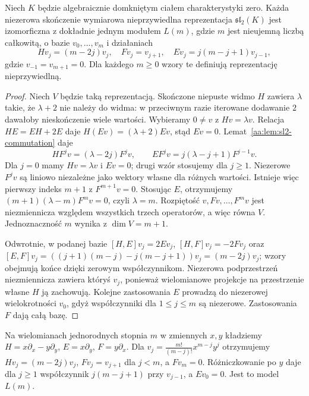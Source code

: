 \begin{twierdzenie}
\label{aa:tw:sl2-simple-modules}
Niech $K$ będzie algebraicznie domkniętym ciałem charakterystyki zero. Każda niezerowa skończenie wymiarowa nieprzywiedlna reprezentacja $\mathfrak{sl}_2(K)$ jest izomorficzna z dokładnie jednym modułem $L(m)$, gdzie $m$ jest nieujemną liczbą całkowitą, o bazie $v_0,\ldots,v_m$ i działaniach
\[
 Hv_j=(m-2j)v_j,\quad Fv_j=v_{j+1},\quad
 Ev_j=j(m-j+1)v_{j-1},
\]
gdzie $v_{-1}=v_{m+1}=0$. Dla każdego $m\ge0$ wzory te definiują reprezentację nieprzywiedlną.
\end{twierdzenie}
\begin{proof}
Niech $V$ będzie taką reprezentacją. Skończone niepuste widmo $H$ zawiera $\lambda$ takie, że $\lambda+2$ nie należy do widma: w przeciwnym razie iterowane dodawanie $2$ dawałoby nieskończenie wiele wartości. Wybieramy $0\ne v$ z $Hv=\lambda v$. Relacja $HE=EH+2E$ daje $H(Ev)=(\lambda+2)Ev$, stąd $Ev=0$. Lemat~\ref{aa:lem:sl2-commutation} daje
\[
 HF^jv=(\lambda-2j)F^jv,\qquad
 EF^jv=j(\lambda-j+1)F^{j-1}v.
\]
Dla $j=0$ mamy $Hv=\lambda v$ i $Ev=0$; drugi wzór stosujemy dla $j\ge1$. Niezerowe $F^jv$ są liniowo niezależne jako wektory własne dla różnych wartości. Istnieje więc pierwszy indeks $m+1$ z $F^{m+1}v=0$. Stosując $E$, otrzymujemy $(m+1)(\lambda-m)F^mv=0$, czyli $\lambda=m$. Rozpiętość $v,Fv,\ldots,F^mv$ jest niezmiennicza względem wszystkich trzech operatorów, a więc równa $V$. Jednoznaczność $m$ wynika z $\dim V=m+1$.

Odwrotnie, w podanej bazie $[H,E]v_j=2Ev_j$, $[H,F]v_j=-2Fv_j$ oraz
$[E,F]v_j=((j+1)(m-j)-j(m-j+1))v_j=(m-2j)v_j$; wzory obejmują końce dzięki zerowym współczynnikom. Niezerowa podprzestrzeń niezmiennicza zawiera któryś $v_j$, ponieważ wielomianowe projekcje na przestrzenie własne $H$ ją zachowują. Kolejne zastosowania $E$ prowadzą do niezerowej wielokrotności $v_0$, gdyż współczynniki dla $1\le j\le m$ są niezerowe. Zastosowania $F$ dają całą bazę.
\end{proof}

\begin{przyklad}
Na wielomianach jednorodnych stopnia $m$ w zmiennych $x,y$ kładziemy $H=x\partial_x-y\partial_y$, $E=x\partial_y$, $F=y\partial_x$. Dla $v_j=\frac{m!}{(m-j)!}x^{m-j}y^j$ otrzymujemy $Hv_j=(m-2j)v_j$, $Fv_j=v_{j+1}$ dla $j<m$, a $Fv_m=0$. Różniczkowanie po $y$ daje dla $j\ge1$ współczynnik $j(m-j+1)$ przy $v_{j-1}$, a $Ev_0=0$. Jest to model $L(m)$.
\end{przyklad}

